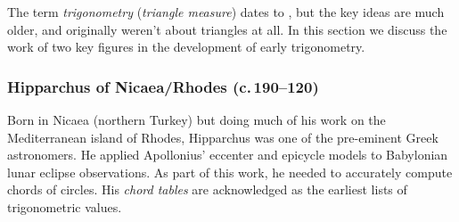 The term \emph{trigonometry} (\emph{triangle measure}) dates to , but the key ideas are much older, and originally weren't about triangles at all. In this section we discuss the work of two key figures in the development of early trigonometry.

\subsubsection*{Hipparchus of Nicaea/Rhodes (c.\,190--120\BC)}\label{pg:hipparchus}

Born in Nicaea (northern Turkey) but doing much of his work on the Mediterranean island of Rhodes, Hipparchus was one of the pre-eminent Greek astronomers. He applied Apollonius' eccenter and epicycle models to Babylonian lunar eclipse observations. As part of this work, he needed to accurately compute chords of circles. His \emph{chord tables} are acknowledged as the earliest lists of trigonometric values.\par

